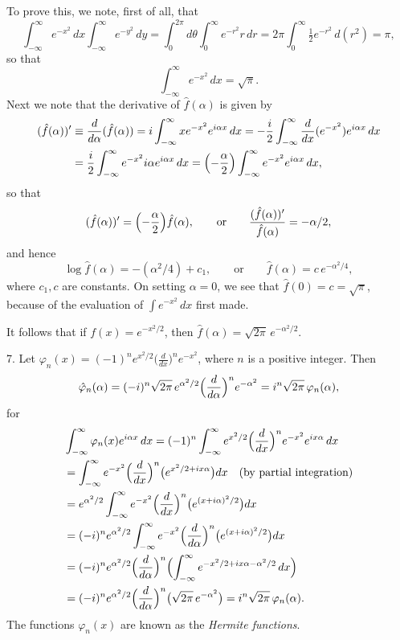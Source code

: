 To prove this, we note, first of all, that
\begin{equation*}
\int_{-\infty}^{\infty}e^{-x^2}\,dx\int_{-\infty}^{\infty}e^{-y^2}\,dy
=\int_0^{2\pi}d\theta\int_0^\infty e^{-r^2}r\,dr
=2\pi\int_0^\infty\tfrac12 e^{-r^2}\,d(r^2)
=\pi,
\end{equation*}
so that
\begin{equation*}
\int_{-\infty}^{\infty}e^{-x^2}\,dx=\sqrt\pi.
\end{equation*}
Next we note that the derivative of $\hat f(\alpha)$ is given by
\begin{align*}
(\hat f(\alpha))'&\equiv\frac{d}{d\alpha}(\hat f(\alpha))
=i\int_{-\infty}^{\infty}x e^{-x^2}e^{i\alpha x}\,dx
=-\frac{i}{2}\int_{-\infty}^{\infty}\frac{d}{dx}(e^{-x^2})e^{i\alpha x}\,dx\\
&=\frac{i}{2}\int_{-\infty}^{\infty}e^{-x^2}i\alpha e^{i\alpha x}\,dx
=\Bigl(-\frac{\alpha}{2}\Bigr)\int_{-\infty}^{\infty}e^{-x^2}e^{i\alpha x}\,dx,
\end{align*}
so that
\begin{equation*}
(\hat f(\alpha))'=\Bigl(-\frac{\alpha}{2}\Bigr)\hat f(\alpha),
\qquad\text{or}\qquad
\frac{(\hat f(\alpha))'}{\hat f(\alpha)}=-\alpha/2,
\end{equation*}
and hence
\begin{equation*}
\log\hat f(\alpha)=-(\alpha^2/4)+c_1,
\qquad\text{or}\qquad
\hat f(\alpha)=c\,e^{-\alpha^2/4},
\end{equation*}
where $c_1,c$ are constants. On setting $\alpha=0$, we see that $\hat f(0)=c=\sqrt\pi$, because of the evaluation of $\int e^{-x^2}\,dx$ first made.

It follows that if $f(x)=e^{-x^2/2}$, then $\hat f(\alpha)=\sqrt{2\pi}\,e^{-\alpha^2/2}$.

7. Let $\varphi_n(x)=(-1)^n e^{x^2/2}\bigl(\frac{d}{dx}\bigr)^n e^{-x^2}$, where $n$ is a positive integer. Then
\begin{equation*}
\hat\varphi_n(\alpha)=(-i)^n\sqrt{2\pi}\,e^{\alpha^2/2}\Bigl(\frac{d}{d\alpha}\Bigr)^n e^{-\alpha^2}
=i^n\sqrt{2\pi}\,\varphi_n(\alpha),
\end{equation*}
for
\begin{align*}
&\int_{-\infty}^{\infty}\varphi_n(x)e^{i\alpha x}\,dx
=(-1)^n\int_{-\infty}^{\infty}e^{x^2/2}\Bigl(\frac{d}{dx}\Bigr)^n e^{-x^2}e^{ix\alpha}\,dx\\
&=\int_{-\infty}^{\infty}e^{-x^2}\Bigl(\frac{d}{dx}\Bigr)^n\bigl(e^{x^2/2+ix\alpha}\bigr)dx
\quad\text{(by partial integration)}\\
&=e^{\alpha^2/2}\int_{-\infty}^{\infty}e^{-x^2}\Bigl(\frac{d}{dx}\Bigr)^n\bigl(e^{(x+i\alpha)^2/2}\bigr)dx\\
&=(-i)^n e^{\alpha^2/2}\int_{-\infty}^{\infty}e^{-x^2}\Bigl(\frac{d}{d\alpha}\Bigr)^n\bigl(e^{(x+i\alpha)^2/2}\bigr)dx\\
&=(-i)^n e^{\alpha^2/2}\Bigl(\frac{d}{d\alpha}\Bigr)^n
\Bigl(\int_{-\infty}^{\infty}e^{-x^2/2+ix\alpha-\alpha^2/2}\,dx\Bigr)\\
&=(-i)^n e^{\alpha^2/2}\Bigl(\frac{d}{d\alpha}\Bigr)^n\bigl(\sqrt{2\pi}\,e^{-\alpha^2}\bigr)
=i^n\sqrt{2\pi}\,\varphi_n(\alpha).
\end{align*}
The functions $\varphi_n(x)$ are known as the \emph{Hermite functions}.

